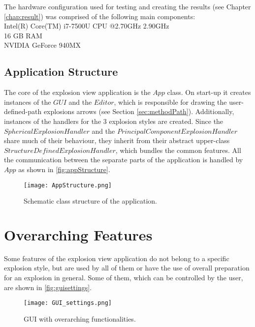 \documentclass[draft,final]{vutinfth} %
\begin{document}
\par The hardware configuration used for testing and creating the results (see Chapter \ref{chap:result}) was comprised of the following main components: 
\\ Intel(R) Core(TM) i7-7500U CPU @2.70GHz 2.90GHz
\\ 16 GB RAM
\\ NVIDIA GeForce 940MX


\subsection{Application Structure}
\label{subsec:appStruct}
The core of the explosion view application is the $App$ class. On start-up it creates instances of the $GUI$ and the $Editor$, which is responsible for drawing the user-defined-path explosions arrows (see Section \ref{sec:methodPath}). Additionally, instances of the handlers for the 3 explosion styles are created. Since the $SphericalExplosionHandler$ and the $PrincipalComponentExplosionHandler$ share much of their behaviour, they inherit from their abstract upper-class $StructureDefinedExplosionHandler$, which bundles the common features.
All the communication between the separate parts of the application is handled by $App$ as shown in \autoref{fig:appStructure}.

\begin{figure}
\centering
\texttt{[image: AppStructure.png]}
\caption{Schematic class structure of the application.}
\label{fig:appStructure}
\end{figure}

\section{Overarching Features}
\label{sec:genFeatures}
Some features of the explosion view application do not belong to a specific explosion style, but are used by all of them or have the use of overall preparation for an explosion in general. Some of them, which can be controlled by the user, are shown in \autoref{fig:guisettings}.

\begin{figure}
\centering
\texttt{[image: GUI\_settings.png]}
\caption{GUI with overarching functionalities.}
\label{fig:guisettings}
\end{figure}
\end{document}
